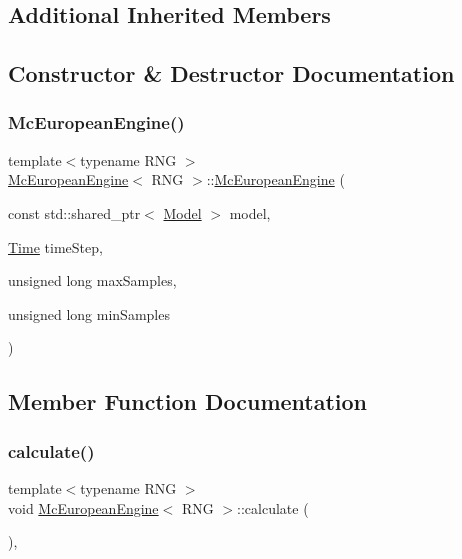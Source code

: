 \subsection*{Additional Inherited Members}


\subsection{Constructor \& Destructor Documentation}
\hypertarget{class_mc_european_engine_a22424812ecaf6e04134eeaa45b9d1e1f}{}\label{class_mc_european_engine_a22424812ecaf6e04134eeaa45b9d1e1f} 
\subsubsection{\texorpdfstring{Mc\+European\+Engine()}{McEuropeanEngine()}}
{\footnotesize\ttfamily template$<$typename R\+NG $>$ \\
\hyperlink{class_mc_european_engine}{Mc\+European\+Engine}$<$ R\+NG $>$\+::\hyperlink{class_mc_european_engine}{Mc\+European\+Engine} (\begin{DoxyParamCaption}\item[{const std\+::shared\+\_\+ptr$<$ \hyperlink{class_model}{Model} $>$}]{model,  }\item[{\hyperlink{_name_def_8h_ac2d3e0ba793497bcca555c7c2cf64ff3}{Time}}]{time\+Step,  }\item[{unsigned long}]{max\+Samples,  }\item[{unsigned long}]{min\+Samples }\end{DoxyParamCaption})}



\subsection{Member Function Documentation}
\hypertarget{class_mc_european_engine_a6c29ef7a7ba6cd1a2f93ee63070cf40e}{}\label{class_mc_european_engine_a6c29ef7a7ba6cd1a2f93ee63070cf40e} 
\subsubsection{\texorpdfstring{calculate()}{calculate()}}
{\footnotesize\ttfamily template$<$typename R\+NG $>$ \\
void \hyperlink{class_mc_european_engine}{Mc\+European\+Engine}$<$ R\+NG $>$\+::calculate (\begin{DoxyParamCaption}{ }\end{DoxyParamCaption})\hspace{0.3cm}{\ttfamily [override]}, {\ttfamily [virtual]}}



